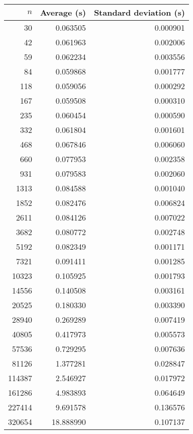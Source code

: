 \begin{tabular}{rrr}
$n$ & Average (s) & Standard deviation (s)\\\hline
30 & 0.063505 & 0.000901\\
42 & 0.061963 & 0.002006\\
59 & 0.062234 & 0.003556\\
84 & 0.059868 & 0.001777\\
118 & 0.059056 & 0.000292\\
167 & 0.059508 & 0.000310\\
235 & 0.060454 & 0.000590\\
332 & 0.061804 & 0.001601\\
468 & 0.067846 & 0.006060\\
660 & 0.077953 & 0.002358\\
931 & 0.079583 & 0.002060\\
1313 & 0.084588 & 0.001040\\
1852 & 0.082476 & 0.006824\\
2611 & 0.084126 & 0.007022\\
3682 & 0.080772 & 0.002748\\
5192 & 0.082349 & 0.001171\\
7321 & 0.091411 & 0.001285\\
10323 & 0.105925 & 0.001793\\
14556 & 0.140508 & 0.003161\\
20525 & 0.180330 & 0.003390\\
28940 & 0.269289 & 0.007419\\
40805 & 0.417973 & 0.005573\\
57536 & 0.729295 & 0.007636\\
81126 & 1.377281 & 0.028847\\
114387 & 2.546927 & 0.017972\\
161286 & 4.983893 & 0.064649\\
227414 & 9.691578 & 0.136576\\
320654 & 18.888990 & 0.107137\\
\end{tabular}
